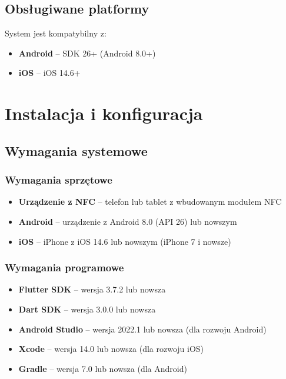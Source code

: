 \documentclass[a4paper,12pt]{article}
\begin{document}
\subsection{Obsługiwane platformy}
System jest kompatybilny z:
\begin{itemize}
    \item \textbf{Android} -- SDK 26+ (Android 8.0+)
    \item \textbf{iOS} -- iOS 14.6+
\end{itemize}

\newpage

\section{Instalacja i konfiguracja}

\subsection{Wymagania systemowe}

\subsubsection{Wymagania sprzętowe}
\begin{itemize}
    \item \textbf{Urządzenie z NFC} -- telefon lub tablet z wbudowanym modułem NFC
    \item \textbf{Android} -- urządzenie z Android 8.0 (API 26) lub nowszym
    \item \textbf{iOS} -- iPhone z iOS 14.6 lub nowszym (iPhone 7 i nowsze)
\end{itemize}

\subsubsection{Wymagania programowe}
\begin{itemize}
    \item \textbf{Flutter SDK} -- wersja 3.7.2 lub nowsza
    \item \textbf{Dart SDK} -- wersja 3.0.0 lub nowsza
    \item \textbf{Android Studio} -- wersja 2022.1 lub nowsza (dla rozwoju Android)
    \item \textbf{Xcode} -- wersja 14.0 lub nowsza (dla rozwoju iOS)
    \item \textbf{Gradle} -- wersja 7.0 lub nowsza (dla Android)
\end{itemize}
\end{document}
